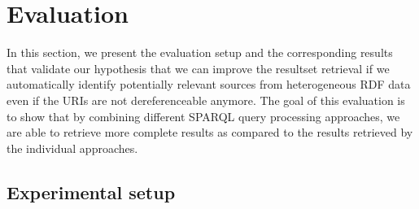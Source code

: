 \section{Evaluation}
\label{ev:wimuq}
In this section, we present the evaluation setup and the corresponding results that validate our hypothesis that we can improve the resultset retrieval if we automatically identify potentially relevant sources from heterogeneous RDF data even if the URIs are not dereferenceable anymore. The goal of this evaluation is to show that by combining different SPARQL query processing approaches, we are able to retrieve more complete results as compared to the results retrieved by the individual approaches. 
\subsection{Experimental setup}


